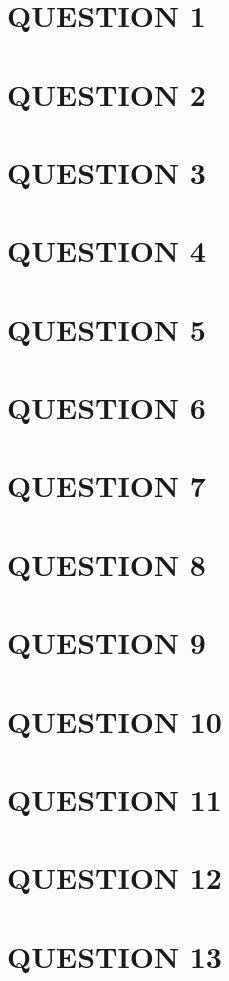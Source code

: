 \documentclass[a4paper]{article}
\begin{document}
	
\maketitle

\section{QUESTION 1}
\section{QUESTION 2}
\section{QUESTION 3}
\section{QUESTION 4}
\section{QUESTION 5}
\section{QUESTION 6}
\section{QUESTION 7}
\section{QUESTION 8}
\section{QUESTION 9}
\section{QUESTION 10}
\section{QUESTION 11}
\section{QUESTION 12}
\section{QUESTION 13}
\end{document}
